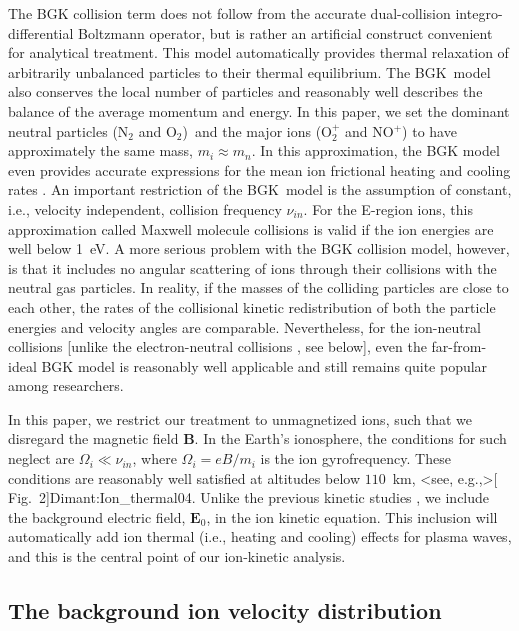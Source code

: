 \documentclass[draft]{agujournal2019}
\renewcommand{\vec}{\mathbf}
\begin{document}
The BGK collision term \cite{Bhatnagar:Model54} does not follow from the accurate dual-collision
integro-differential Boltzmann operator, but is rather an artificial construct
convenient for analytical treatment. This model automatically provides thermal
relaxation of arbitrarily unbalanced particles to their thermal equilibrium.
The BGK\ model also conserves the local number of particles and reasonably
well describes the balance of the average momentum and energy. In this paper,
we set the dominant neutral particles (N$_{2}$ and O$_{2}$)\ and the major
ions (O$_{2}^{+}$ and NO$^{+}$) to have approximately the same mass,
$m_{i}\approx m_{n}$. In this approximation, the BGK model even provides
accurate expressions for the mean ion frictional heating and cooling rates
\cite{Dimant:Deriving24}. An important restriction of the BGK\ model is the
assumption of constant, i.e., velocity independent, collision frequency
$\nu_{in}$. For the E-region ions, this approximation called Maxwell 
molecule collisions \cite{Schunk:Ionospheres09} is valid if the ion
energies are well below 1~eV. A more serious problem with the BGK collision 
model, however, is that it includes no angular scattering
of ions through their collisions with the neutral gas particles. In reality,
if the masses of the colliding particles are close to each other, the rates of
the collisional kinetic redistribution of both the particle energies and
velocity angles are comparable. Nevertheless, for the ion-neutral collisions
[unlike the electron-neutral collisions \cite{Dimant:Kinetic95a}, see below],
even the far-from-ideal BGK model is reasonably well applicable and still remains
quite popular among researchers.

In this paper, we restrict our treatment to unmagnetized ions, such that we
disregard the magnetic field $\vec{B}$. In the
Earth's ionosphere, the conditions for such neglect are $\Omega_{i}\ll\nu
_{in}$, where $\Omega_{i}=eB/m_{i}$ is the ion gyrofrequency. These conditions
are reasonably well satisfied at altitudes below $110$~km,
\citeA<see, e.g.,>[ Fig.~2]{Dimant:Ion_thermal04}. Unlike the previous kinetic studies
\cite{Farley:Plasma63,Lee:High-Frequency71,Schmidt:Density73,Ossakow:Parallel75,Schlegel:Short83}, 
we include the background electric field,
$\vec{E}_{0}$, in the ion kinetic equation. This inclusion will automatically add
ion thermal (i.e., heating and cooling) effects for plasma waves, and this is the central
point of our ion-kinetic analysis.

\subsection{The background ion velocity
distribution\label{The background ion velocity distribution}}
\end{document}
